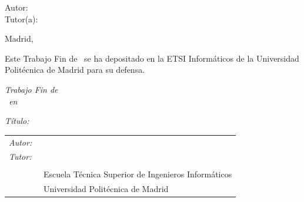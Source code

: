 \begin{titlepage}
\vspace*{0.5cm}
\begin{center}
\huge\bfseries {\TituloTFG}
\end{center}

\vspace*{5cm}

\noindent
\large{Autor: \NombreAutor{} }\\
\large{Tutor(a): \NombreTutor{} }

\vspace*{3cm}
\begin{center}
Madrid, \Fecha
\end{center}

\clearpage

\thispagestyle{empty}
\noindent
Este Trabajo Fin de \Estudios\ se ha depositado en la ETSI Informáticos de la Universidad Politécnica de Madrid para su defensa.

\vspace*{4cm}

\noindent
\textit{Trabajo Fin de \Estudios}\\
\textit{\Estudios\ en \TituloEstudios}

\begin{minipage}[t]{0.1\linewidth}
  \textit{Título:}
\end{minipage}
\begin{minipage}[t]{0.88\linewidth}
  \TituloTFG
\end{minipage}

\Fecha

\vspace*{4cm}

\noindent
\begin{tabular}{lp{0.85\linewidth}}
  \textit{Autor:} & \NombreAutor{}  \\
  \textit{Tutor:} & \NombreTutor{}  \\
                  & \Departamento{} \\
                  & Escuela Técnica Superior de Ingenieros Informáticos\\
                  & Universidad Politécnica de Madrid
\end{tabular}
\end{titlepage}
